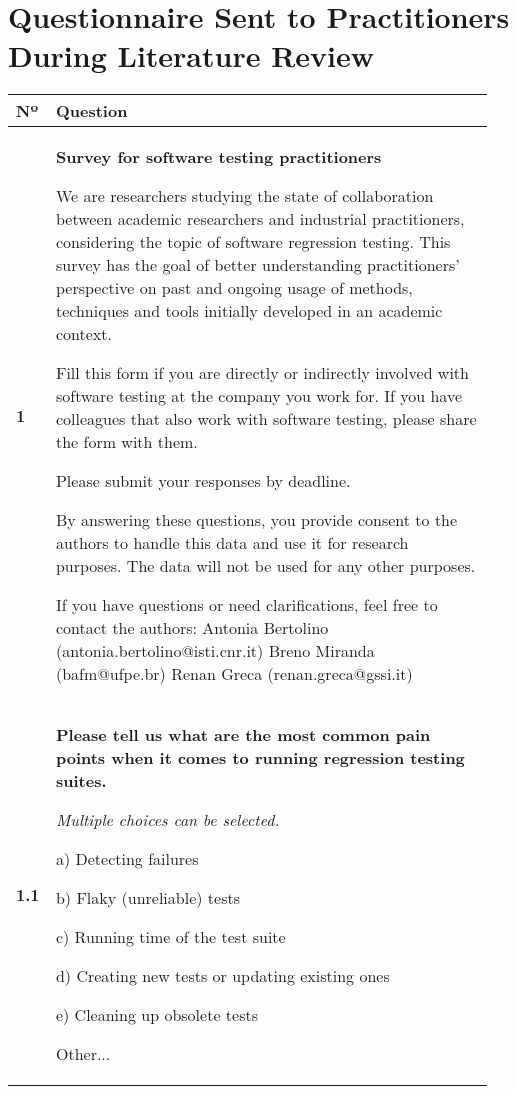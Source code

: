 \section{Questionnaire Sent to Practitioners During Literature Review}
\label{sec:app_prac_questionnaire}

\begin{table}[h!]
\centering
\small
{}
\begin{tabular}{p{0.05\linewidth}p{0.9\linewidth}}
\toprule
\textbf{Nº} & \textbf{Question} \\
\midrule
\textbf{1} & \textbf{Survey for software testing practitioners}

We are researchers studying the state of collaboration between academic researchers and industrial practitioners, considering the topic of software regression testing. This survey has the goal of better understanding practitioners' perspective on past and ongoing usage of methods, techniques and tools initially developed in an academic context.

Fill this form if you are directly or indirectly involved with software testing at the company you work for. If you have colleagues that also work with software testing, please share the form with them.

Please submit your responses by {{deadline}}.

By answering these questions, you provide consent to the authors to handle this data and use it for research purposes. The data will not be used for any other purposes.

If you have questions or need clarifications, feel free to contact the authors:
Antonia Bertolino (antonia.bertolino@isti.cnr.it)
Breno Miranda (bafm@ufpe.br)
Renan Greca (renan.greca@gssi.it) \\

\textbf{1.1} & \textbf{Please tell us what are the most common pain points when it comes to running regression testing suites.}

\textit{Multiple choices can be selected.}

a) Detecting failures

b) Flaky (unreliable) tests 

c) Running time of the test suite

d) Creating new tests or updating existing ones

e) Cleaning up obsolete tests 

Other... \\


\end{tabular}
\end{table}
